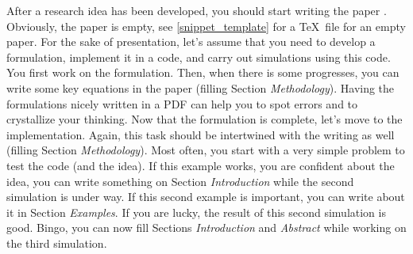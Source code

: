 \documentclass[authoryear,3p,times,preprint,review,fleqn]{elsarticle}
\numberwithin{equation}{section}
\theoremstyle{remark}
\begin{document}
After a research idea has been developed, you should start writing the paper \citep{Gray:2005a}. Obviously, the paper is empty, see \cref{snippet_template} for a \TeX\ file for an empty paper.
For the sake of presentation, let's assume that you need to develop a formulation, implement it in a code, and carry out simulations using this code. You first work on the formulation. Then, when there is some progresses, you can write some key equations in the paper (filling Section \textit{Methodology}). Having the formulations nicely written in a PDF can help you to spot errors and to crystallize your thinking. Now that the formulation is complete, let's move to the implementation. Again, this task should be intertwined  with the writing as well (filling Section \textit{Methodology}). Most often, you start with a very simple problem to test the code (and the idea). If this example works, you are confident about the idea, you can write something on Section \textit{Introduction} while the second simulation is under way. If this second example is important, you can write about it in Section \textit{Examples}. If you are lucky, the result of this second simulation is  good. Bingo, you can now fill  Sections \textit{Introduction} and  \textit{Abstract} while working on the third simulation.
\begin{figure}[!h]
\end{figure}
\end{document}
